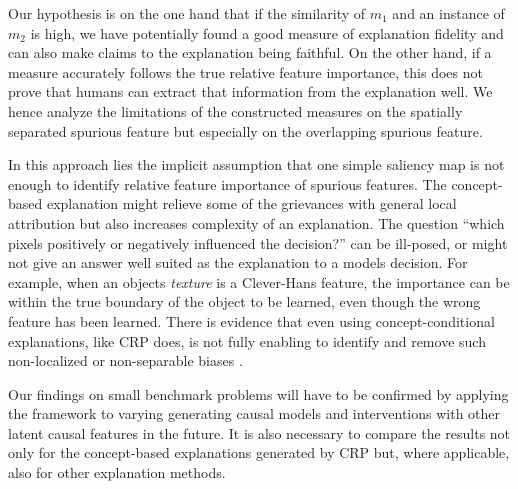 Our hypothesis is on the one hand that if the similarity of $m_1$ and an instance of $m_2$ is high, we have potentially found a good measure of explanation fidelity and can also make claims to the explanation being faithful. On the other hand, if a measure accurately follows the true relative feature importance, this does not prove that humans can extract that information from the explanation well. We hence analyze the limitations of the constructed measures on the spatially separated spurious feature but especially on the overlapping spurious feature. 

In this approach lies the implicit assumption that one simple saliency map is not enough to identify relative feature importance of spurious features. The concept-based explanation might relieve some of the grievances with general local attribution but also increases complexity of an explanation. 
The question ``which pixels positively or negatively influenced the decision?'' can be ill-posed, or might not give an answer well suited as the explanation to a models decision. For example, when an objects \textit{texture} is a Clever-Hans feature, the importance can be within the true boundary of the object to be learned, even though the wrong feature has been learned. There is evidence that even using concept-conditional explanations, like CRP does, is not fully enabling to identify and remove such non-localized or non-separable biases \citep{Dreyer2023a}. 

Our findings on small benchmark problems will have to be confirmed by applying the framework to varying generating causal models and interventions with other latent causal features in the future. 
It is also necessary to compare the results not only for the concept-based explanations generated by CRP but, where applicable, also for other explanation methods.

